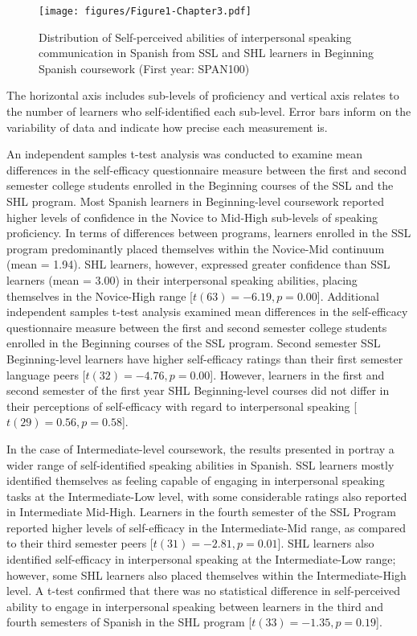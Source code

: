 \documentclass[output=paper]{langscibook}
\begin{document}
\begin{figure}
\caption{Distribution of Self-perceived abilities of interpersonal speaking communication in Spanish from SSL and SHL learners in Beginning Spanish coursework (First year: SPAN100)}
\label{fig:3:1}
\texttt{[image: figures/Figure1-Chapter3.pdf]}
\end{figure}

The horizontal axis includes sub-levels of proficiency and vertical axis relates to the number of learners who self-identified each sub-level. Error bars inform on the variability of data and indicate how precise each measurement is.

An independent samples t-test analysis was conducted to examine mean differences in the self-efficacy questionnaire measure between the first and second semester college students enrolled in the Beginning courses of the SSL and the SHL program. Most Spanish learners in Beginning-level coursework reported higher levels of confidence in the Novice to Mid-High sub-levels of speaking proficiency. In terms of differences between programs, learners enrolled in the SSL program predominantly placed themselves within the Novice-Mid continuum (mean = 1.94). SHL learners, however, expressed greater confidence than SSL learners (mean = 3.00) in their interpersonal speaking abilities, placing themselves in the Novice-High range [$t(63) = -6.19, p = 0.00$].  Additional in\-de\-pen\-dent samples t-test analysis examined mean differences in the self-efficacy questionnaire measure between the first and second semester college students enrolled in the Beginning courses of the SSL program. Second semester SSL Beginning-level learners have higher self-efficacy ratings than their first se\-mes\-ter language peers [$t(32) = -4.76,\allowbreak p = 0.00$]. However, learners in the first and second semester of the first year SHL Beginning-level courses did not differ in their perceptions of self-efficacy with regard to interpersonal speaking [$t(29) = 0.56,\allowbreak p = 0.58$].

\begin{sloppypar}
In the case of Intermediate-level coursework, the results presented in  portray a wider range of self-identified speaking abilities in Spanish. SSL learners mostly identified themselves as feeling capable of engaging in interpersonal speaking tasks at the Intermediate-Low level, with some considerable ratings also reported in Intermediate Mid-High. Learners in the fourth semester of the SSL Program reported higher levels of self-efficacy in the Intermediate-Mid range, as compared to their third semester peers [$t(31) = -2.81,\allowbreak p = 0.01$]. SHL learners also identified self-efficacy in interpersonal speaking at the Intermediate-Low range; however, some SHL learners also placed themselves within the Intermediate-High level. A t-test confirmed that there was no statistical difference in self-perceived ability to engage in interpersonal speaking between learners in the third and fourth semesters of Spanish in the SHL program [$t(33) = -1.35,\allowbreak p = 0.19$].
\end{sloppypar}
\end{document}
